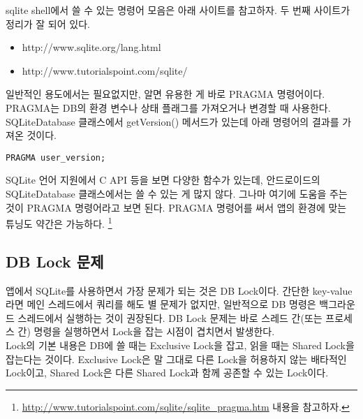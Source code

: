 sqlite shell에서 쓸 수 있는 명령어 모음은 아래 사이트를 참고하자. 두 번째 사이트가 정리가 잘 되어 있다.
\begin{itemize}
\item http://www.sqlite.org/lang.html
\item http://www.tutorialspoint.com/sqlite/
\end{itemize}



일반적인 용도에서는 필요없지만, 알면 유용한 게 바로 PRAGMA 명령어이다. PRAGMA는 DB의 환경 변수나 상태 플래그를 가져오거나 변경할 때 사용한다.
SQLiteDatabase 클래스에서 getVersion() 메서드가 있는데 아래 명령어의 결과를 가져온 것이다. 
\begin{lstlisting}[frame=single]
PRAGMA user_version; 
\end{lstlisting}

SQLite 언어 지원에서 C API 등을 보면 다양한 함수가 있는데, 안드로이드의 SQLiteDatabase 클래스에서는 쓸 수 있는 게 많지 않다.
그나마 여기에 도움을 주는 것이 PRAGMA 명령어라고 보면 된다. PRAGMA 명령어를 써서 앱의 환경에 맞는 튜닝도 약간은 가능하다.
\footnote{\url{http://www.tutorialspoint.com/sqlite/sqlite_pragma.htm} 내용을 참고하자.}


\subsection{DB Lock 문제}
앱에서 SQLite를 사용하면서 가장 문제가 되는 것은 DB Lock이다.
간단한 key-value라면 메인 스레드에서 쿼리를 해도 별 문제가 없지만, 일반적으로 DB 명령은 백그라운드 스레드에서 실행하는 것이 권장된다. 
DB Lock 문제는 바로 스레드 간(또는 프로세스 간) 명령을 실행하면서 Lock을 잡는 시점이 겹치면서 발생한다.\\

Lock의 기본 내용은 DB에 쓸 때는 Exclusive Lock을 잡고, 읽을 때는 Shared Lock을 잡는다는 것이다.
Exclusive Lock은 말 그대로 다른 Lock을 허용하지 않는 배타적인 Lock이고, Shared Lock은 다른 Shared Lock과 함께 공존할 수 있는 Lock이다.\\

